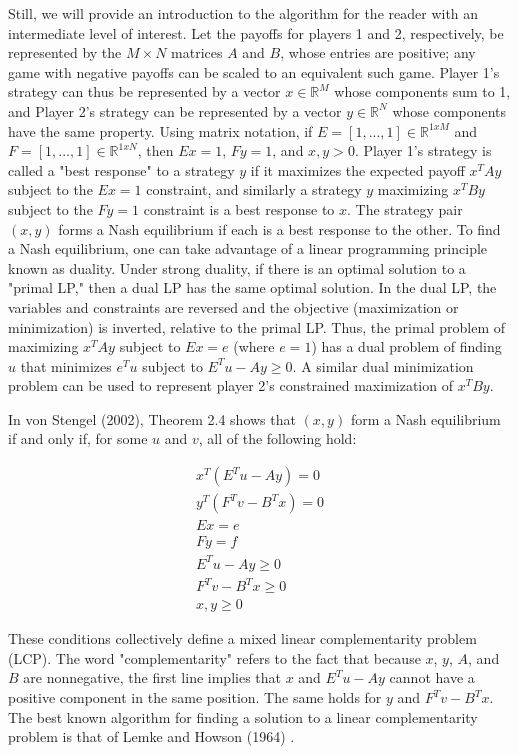 \documentclass{article}
\begin{document}
Still, we will provide an introduction to the algorithm for the reader with an intermediate level of interest. Let the payoffs for players 1 and 2, respectively, be represented by the $M \times N$ matrices $A$ and $B$, whose entries are positive; any game with negative payoffs can be scaled to an equivalent such game. Player 1's strategy can thus be represented by a vector $x \in \mathbb{R}^M$ whose components sum to 1, and Player 2's strategy can be represented by a vector $y \in \mathbb{R}^N$ whose components have the same property. Using matrix notation, if $E=[1, ..., 1]\in\mathbb{R}^{1xM}$ and $F=[1, ..., 1]\in\mathbb{R}^{1xN}$, then $Ex=1$, $Fy=1$, and $x,y>0$.  Player 1's strategy is called a "best response" to a strategy $y$ if it maximizes the expected payoff $x^TAy$ subject to the $Ex=1$ constraint, and similarly a strategy $y$ maximizing $x^TBy$ subject to the $Fy=1$ constraint is a best response to $x$. The strategy pair $(x,y)$ forms a Nash equilibrium if each is a best response to the other. To find a Nash equilibrium, one can take advantage of a linear programming principle known as duality. Under strong duality, if there is an optimal solution to a "primal LP," then a dual LP has the same optimal solution. In the dual LP, the variables and constraints are reversed and the objective (maximization or minimization) is inverted, relative to the primal LP. Thus, the primal problem of maximizing $x^TAy$ subject to $Ex=e$ (where $e=1$) has a dual problem of finding $u$ that minimizes $e^Tu$ subject to $E^Tu-Ay \geq 0$. A similar dual minimization problem can be used to represent player 2's constrained maximization of $x^TBy$.

In von Stengel (2002), Theorem 2.4 shows that $(x,y)$ form a Nash equilibrium if and only if, for some $u$ and $v$, all of the following hold:

\begin{align*}
x^T(E^Tu-Ay) = 0 \\
y^T(F^Tv-B^Tx) = 0 \\
Ex = e \\
Fy = f\\
E^T u - A y \geq 0 \\
F^Tv - B^Tx \geq 0 \\
x, y \geq 0
\end{align*}

\noindent These conditions collectively define a mixed linear complementarity problem (LCP). The word "complementarity" refers to the fact that because $x$, $y$, $A$, and $B$ are nonnegative, the first line implies that $x$ and $E^Tu-Ay$ cannot have a positive component in the same position. The same holds for $y$ and $F^Tv-B^Tx$. The best known algorithm for finding a solution to a linear complementarity problem is that of Lemke and Howson (1964) \cite{lemkehowson}. 
\end{document}
